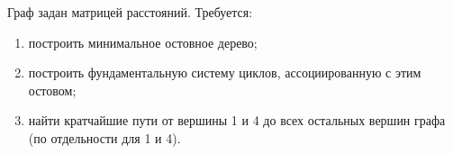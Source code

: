 \question
Граф задан матрицей расстояний. Требуется:
\begin{enumerate}
\item построить минимальное остовное дерево;
\item построить фундаментальную систему циклов, ассоциированную с этим остовом;
\item найти кратчайшие пути от вершины 1 и 4 до всех остальных вершин графа (по отдельности для 1 и 4).
\end{enumerate}
\begin{figure}[h]

\begin{minipage}[h]{0.55\linewidth}
\end{minipage}
\begin{minipage}[h]{0.45\linewidth}
\end{minipage}
\end{figure}

